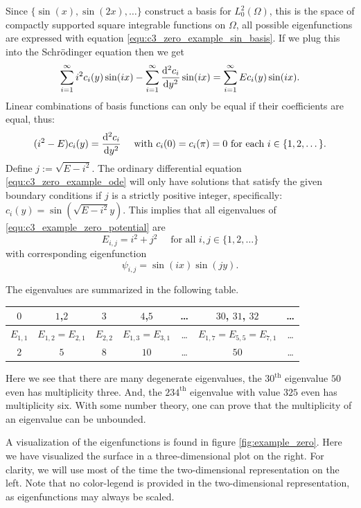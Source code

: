 Since $\{\sin(x), \sin(2x), \dots\}$ construct a basis for $L^2_0(\Omega)$, this is the space of compactly supported square integrable functions on $\Omega$, all possible eigenfunctions are expressed with equation \eqref{equ:c3_zero_example_sin_basis}. If we plug this into the Schrödinger equation then we get
$$
  \sum_{i=1}^\infty i^2 c_i(y) \sin(ix) - \sum_{i=1}^\infty \dv[2]{c_i}{y}(y) \sin(ix) = \sum_{i=1}^\infty E c_i(y) \sin(ix)\text{.}
$$
Linear combinations of basis functions can only be equal if their coefficients are equal, thus:
\begin{equation}\label{equ:c3_zero_example_ode}
  (i^2 - E) c_i(y) = \dv[2]{c_i}{y}(y) \quad \text{ with $c_i(0) = c_i(\pi) = 0$ for each $i \in \{1, 2, \dots\}$.}
\end{equation}
Define $j := \sqrt{E - i^2}$. The ordinary differential equation \eqref{equ:c3_zero_example_ode} will only have solutions that satisfy the given boundary conditions if $j$ is a strictly positive integer, specifically: $c_i(y) = \sin\left(\sqrt{E-i^2} y\right)$. This implies that all eigenvalues of \eqref{equ:c3_example_zero_potential} are
$$
  E_{i, j} = i^2 + j^2 \quad \text{ for all $i, j \in \{1, 2, \dots\}$}
$$
with corresponding eigenfunction
\begin{equation}\label{equ:c3_zero_example_eigenfunctions}
  \psi_{i,j} = \sin(ix) \sin(jy)\text{.}
\end{equation}

The eigenvalues are summarized in the following table.

\begin{tabular}{ccccccc}
  \toprule
  $0$       & $1$,$2$             & $3$       & $4$,$5$             & \dots & $30$, $31$, $32$              & \dots \\
  \midrule
  $E_{1,1}$ & $E_{1,2} = E_{2,1}$ & $E_{2,2}$ & $E_{1,3} = E_{3,1}$ & \dots & $E_{1,7} = E_{5,5} = E_{7,1}$ & \dots \\
  $2$       & $5$                 & $8$       & $10$                & \dots & $50$                          & \dots \\
  \bottomrule
\end{tabular}

Here we see that there are many degenerate eigenvalues, the $30^\text{th}$ eigenvalue $50$ even has multiplicity three. And, the $234^\text{th}$ eigenvalue with value $325$ even has multiplicity six. With some number theory, one can prove that the multiplicity of an eigenvalue can be unbounded.

A visualization of the eigenfunctions is found in figure \ref{fig:example_zero}. Here we have visualized the surface in a three-dimensional plot on the right. For clarity, we will use most of the time the two-dimensional representation on the left. Note that no color-legend is provided in the two-dimensional representation, as eigenfunctions may always be scaled.

